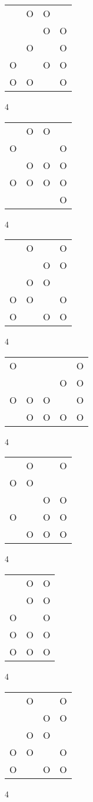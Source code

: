 \begin{tabular}{|m{0.2cm}m{0.2cm}m{0.2cm}m{0.2cm}|}\hline
 &O&O& \\
 & &O&O\\
 &O& &O\\
O& &O&O\\
O&O& &O\\
\hline\end{tabular}4
\begin{tabular}{|m{0.2cm}m{0.2cm}m{0.2cm}m{0.2cm}|}\hline
 &O&O& \\
O& & &O\\
 &O&O&O\\
O&O&O&O\\
 & & &O\\
\hline\end{tabular}4
\begin{tabular}{|m{0.2cm}m{0.2cm}m{0.2cm}m{0.2cm}|}\hline
 &O& &O\\
 & &O&O\\
 &O&O& \\
O&O& &O\\
O& &O&O\\
\hline\end{tabular}4
\begin{tabular}{|m{0.2cm}m{0.2cm}m{0.2cm}m{0.2cm}m{0.2cm}|}\hline
O& & & &O\\
 & & &O&O\\
O&O&O& &O\\
 &O&O&O&O\\
\hline\end{tabular}4
\begin{tabular}{|m{0.2cm}m{0.2cm}m{0.2cm}m{0.2cm}|}\hline
 &O& &O\\
O&O& & \\
 & &O&O\\
O& &O&O\\
 &O&O&O\\
\hline\end{tabular}4
\begin{tabular}{|m{0.2cm}m{0.2cm}m{0.2cm}|}\hline
 &O&O\\
 &O&O\\
O& &O\\
O&O&O\\
O&O&O\\
\hline\end{tabular}4
\begin{tabular}{|m{0.2cm}m{0.2cm}m{0.2cm}m{0.2cm}|}\hline
 &O& &O\\
 & &O&O\\
 &O&O& \\
O&O& &O\\
O& &O&O\\
\hline\end{tabular}4
